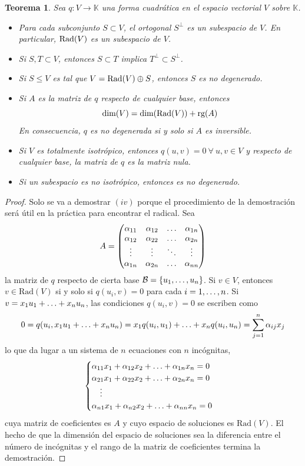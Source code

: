 \documentclass[12pt]{report}
\newtheorem{theorem}{Teorema}[chapter]
\theoremstyle{definition}
\theoremstyle{definition}
\theoremstyle{remark}
\begin{document}
\begin{theorem}
\label{teo4.1.}
Sea $q \colon V \to \mathbb{K}$ una forma cuadrática en el espacio vectorial $V$ sobre $\mathbb{K}$.
\begin{itemize}
    \item[(i)] Para cada subconjunto $S \subset V$, el ortogonal $S^\perp$ es un subespacio de $V$. En particular, $\textup{Rad}(V)$ es un subespacio de $V$.
    \item[(ii)] Si $S,T \subset V$, entonces $S \subset T$ implica $T^\perp \subset S^\perp$.
    \item[(iii)] Si $S \leq V$ es tal que $V = \textup{Rad}(V) \oplus S$, entonces $S$ es no degenerado.
    \item[(iv)] Si $A$ es la matriz de $q$ respecto de cualquier base, entonces 
    \[\textup{dim}(V) = \textup{dim}(\textup{Rad}(V))+\textup{rg}(A)\]
    En consecuencia, $q$ es no degenerada si y solo si $A$ es inversible.
    \item[(v)] Si $V$ es totalmente isotrópico, entonces $q(u,v) = 0 \ \forall \ u,v \in V$ y respecto de cualquier base, la matriz de $q$ es la matriz nula.
    \item[(vi)] Si un subespacio es no isotrópico, entonces es no degenerado.
\end{itemize}
\end{theorem}

\begin{proof}
Solo se va a demostrar $(iv)$ porque el procedimiento de la demostración será útil en la práctica para encontrar el radical. Sea
\[A = \begin{pmatrix*}
    \alpha_{11} & \alpha_{12} & \mathellipsis & \alpha_{1n} \\
    \alpha_{12} & \alpha_{22} & \mathellipsis & \alpha_{2n} \\
    \vdots & \vdots & \ddots & \vdots \\
    \alpha_{1n} & \alpha_{2n} & \mathellipsis & \alpha_{nn}
\end{pmatrix*}\]
la matriz de $q$ respecto de cierta base $\mathcal{B} = \{u_1,\mathellipsis,u_n\}$. Si $v \in V$, entonces $v \in \textrm{Rad}(V)$ si y solo si $q(u_i,v) = 0$ para cada $i = 1,\mathellipsis,n$. Si $v = x_1u_1+\mathellipsis+x_nu_n$, las condiciones $q(u_i,v) = 0$ se escriben como
\[0 = q(u_i,x_1u_1+\mathellipsis+x_nu_n) = x_1q(u_i,u_1)+\mathellipsis+x_nq(u_i,u_n) = \sum_{j=1}^n\alpha_{ij}x_j\]
lo que da lugar a un sistema de $n$ ecuaciones con $n$ incógnitas,
\[
\begin{cases}
    \alpha_{11}x_1+\alpha_{12}x_2+\mathellipsis+\alpha_{1n}x_n = 0 \\
    \alpha_{21}x_1+\alpha_{22}x_2+\mathellipsis+\alpha_{2n}x_n = 0\\
    \ \ \ \vdots \\
    \alpha_{n1}x_1+\alpha_{n2}x_2+\mathellipsis+\alpha_{nn}x_n = 0\\
\end{cases}
\]
cuya matriz de coeficientes es $A$ y cuyo espacio de soluciones es $\textrm{Rad}(V)$. El hecho de que la dimensión del espacio de soluciones sea la diferencia entre el número de incógnitas y el rango de la matriz de coeficientes termina la demostración.
\end{proof}
\end{document}
